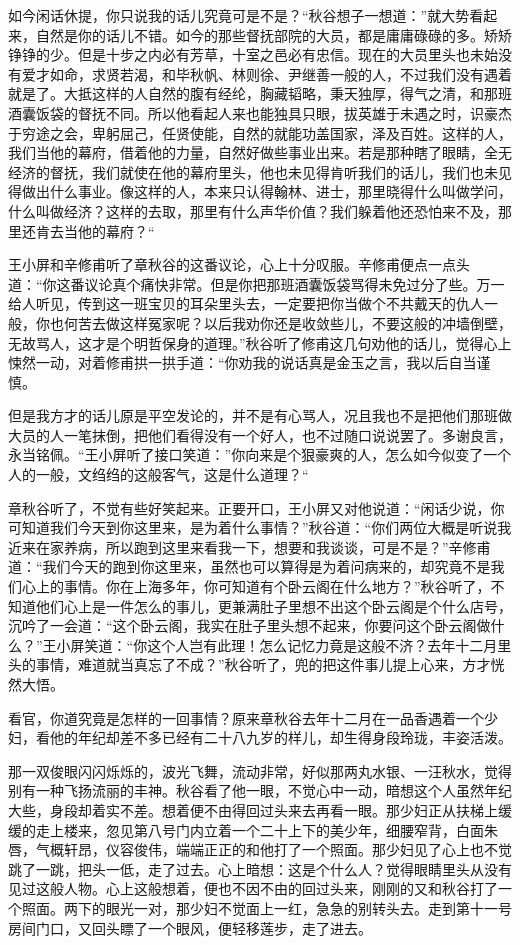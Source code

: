 \documentclass[12pt,UTF8]{ctexbook}
\begin{document}
{{{如今闲话休提，你只说我的话儿究竟可是不是？“秋谷想子一想道：”就大势看起来，自然是你的话儿不错。如今的那些督抚部院的大员，都是庸庸碌碌的多。矫矫铮铮的少。但是十步之内必有芳草，十室之邑必有忠信。现在的大员里头也未始没有爱才如命，求贤若渴，和毕秋帆、林则徐、尹继善一般的人，不过我们没有遇着就是了。大抵这样的人自然的腹有经纶，胸藏韬略，秉天独厚，得气之清，和那班酒囊饭袋的督抚不同。所以他看起人来也能独具只眼，拔英雄于未遇之时，识豪杰于穷途之会，卑躬屈己，任贤使能，自然的就能功盖国家，泽及百姓。这样的人，我们当他的幕府，借着他的力量，自然好做些事业出来。若是那种瞎了眼睛，全无经济的督抚，我们就使在他的幕府里头，他也未见得肯听我们的话儿，我们也未见得做出什么事业。像这样的人，本来只认得翰林、进士，那里晓得什么叫做学问，什么叫做经济？这样的去取，那里有什么声华价值？我们躲着他还恐怕来不及，那里还肯去当他的幕府？“

王小屏和辛修甫听了章秋谷的这番议论，心上十分叹服。辛修甫便点一点头道：“你这番议论真个痛快非常。但是你把那班酒囊饭袋骂得未免过分了些。万一给人听见，传到这一班宝贝的耳朵里头去，一定要把你当做个不共戴天的仇人一般，你也何苦去做这样冤家呢？以后我劝你还是收敛些儿，不要这般的冲墙倒壁，无故骂人，这才是个明哲保身的道理。”秋谷听了修甫这几句劝他的话儿，觉得心上悚然一动，对着修甫拱一拱手道：“你劝我的说话真是金玉之言，我以后自当谨慎。

但是我方才的话儿原是平空发论的，并不是有心骂人，况且我也不是把他们那班做大员的人一笔抹倒，把他们看得没有一个好人，也不过随口说说罢了。多谢良言，永当铭佩。“王小屏听了接口笑道：”你向来是个狠豪爽的人，怎么如今似变了一个人的一般，文绉绉的这般客气，这是什么道理？“

章秋谷听了，不觉有些好笑起来。正要开口，王小屏又对他说道：“闲话少说，你可知道我们今天到你这里来，是为着什么事情？”秋谷道：“你们两位大概是听说我近来在家养病，所以跑到这里来看我一下，想要和我谈谈，可是不是？”辛修甫道：“我们今天的跑到你这里来，虽然也可以算得是为着问病来的，却究竟不是我们心上的事情。你在上海多年，你可知道有个卧云阁在什么地方？”秋谷听了，不知道他们心上是一件怎么的事儿，更兼满肚子里想不出这个卧云阁是个什么店号，沉吟了一会道：“这个卧云阁，我实在肚子里头想不起来，你要问这个卧云阁做什么？”王小屏笑道：“你这个人岂有此理！怎么记忆力竟是这般不济？去年十二月里头的事情，难道就当真忘了不成？”秋谷听了，兜的把这件事儿提上心来，方才恍然大悟。

看官，你道究竟是怎样的一回事情？原来章秋谷去年十二月在一品香遇着一个少妇，看他的年纪却差不多已经有二十八九岁的样儿，却生得身段玲珑，丰姿活泼。

那一双俊眼闪闪烁烁的，波光飞舞，流动非常，好似那两丸水银、一汪秋水，觉得别有一种飞扬流丽的丰神。秋谷看了他一眼，不觉心中一动，暗想这个人虽然年纪大些，身段却着实不差。想着便不由得回过头来去再看一眼。那少妇正从扶梯上缓缓的走上楼来，忽见第八号门内立着一个二十上下的美少年，细腰窄背，白面朱唇，气概轩昂，仪容俊伟，端端正正的和他打了一个照面。那少妇见了心上也不觉跳了一跳，把头一低，走了过去。心上暗想：这是个什么人？觉得眼睛里头从没有见过这般人物。心上这般想着，便也不因不由的回过头来，刚刚的又和秋谷打了一个照面。两下的眼光一对，那少妇不觉面上一红，急急的别转头去。走到第十一号房间门口，又回头瞟了一个眼风，便轻移莲步，走了进去。

}}}
\end{document}
